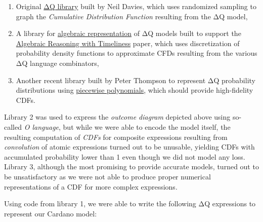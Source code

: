 \documentclass[10pt]{article}
\providecommand{\tightlist}{%
  \setlength{\itemsep}{0pt}\setlength{\parskip}{0pt}}
\begin{document}
\begin{enumerate}
\def\labelenumi{\arabic{enumi}.}
\tightlist
\item
  Original \href{https://github.com/DeltaQ-SD/pnsol-deltaq-clone}{ΔQ
  library} built by Neil Davies, which uses randomized sampling to graph
  the \emph{Cumulative Distribution Function} resulting from the ΔQ
  model,
\item
  A library for \href{https://github.com/DeltaQ-SD/Artjoms}{algebraic
  representation} of ΔQ models built to support the
  \href{https://arxiv.org/pdf/2308.10654v1.pdf}{Algebraic Reasoning with
  Timeliness} paper, which uses discretization of probability density
  functions to approximate CFDs resulting from the various ΔQ language
  combinators,
\item
  Another recent library built by Peter Thompson to represent ΔQ
  probability distributions using
  \href{https://github.com/DeltaQ-SD/dqsd-piecewise-poly}{piecewise
  polynomials}, which should provide high-fidelity CDFs.
\end{enumerate}

Library 2 was used to express the \emph{outcome diagram} depicted above
using so-called \emph{O language}, but while we were able to encode the
model itself, the resulting computation of \emph{CDFs} for composite
expressions resulting from \emph{convolution} of atomic expressions
turned out to be unusable, yielding CDFs with accumulated probability
lower than 1 even though we did not model any loss. Library 3, although
the most promising to provide accurate models, turned out to be
unsatisfactory as we were not able to produce proper numerical
representations of a CDF for more complex expressions.

Using code from library 1, we were able to write the following ΔQ
expressions to represent our Cardano model:
\end{document}
